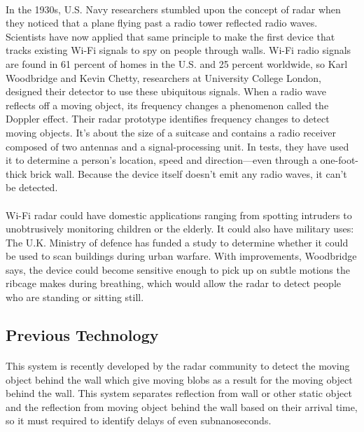 \documentclass[a4paper,12pt,oneside]{article}
\begin{document}
\paragraph{}
In the 1930s, U.S. Navy researchers stumbled upon the concept of radar when they
noticed that a plane flying past a radio tower reflected radio waves. Scientists have now applied
that same principle to make the first device that tracks existing Wi-Fi signals to spy on people
through walls. Wi-Fi radio signals are found in 61 percent of homes in the U.S. and 25 percent
worldwide, so Karl Woodbridge and Kevin Chetty, researchers at University College London,
designed their detector to use these ubiquitous signals. When a radio wave reflects off a moving
object, its frequency changes a phenomenon called the Doppler effect. Their radar prototype
identifies frequency changes to detect moving objects. It's about the size of a suitcase and
contains a radio receiver composed of two antennas and a signal-processing unit. In tests, they
have used it to determine a person's location, speed and direction—even through a one-foot-thick
brick wall. Because the device itself doesn't emit any radio waves, it can't be detected.
\paragraph{}
Wi-Fi radar could have domestic applications ranging from spotting intruders to
unobtrusively monitoring children or the elderly. It could also have military uses: The U.K.
Ministry of defence has funded a study to determine whether it could be used to scan buildings
during urban warfare. With improvements, Woodbridge says, the device could become sensitive
enough to pick up on subtle motions the ribcage makes during breathing, which would allow the
radar to detect people who are standing or sitting still.









\subsection{Previous Technology}

\paragraph{}
This system is recently developed by the radar community to detect the moving object
behind the wall which give moving blobs as a result for the moving object behind the wall. This
system separates reflection from wall or other static object and the reflection from moving object
behind the wall based on their arrival time, so it must required to identify delays of even subnanoseconds.
\end{document}
